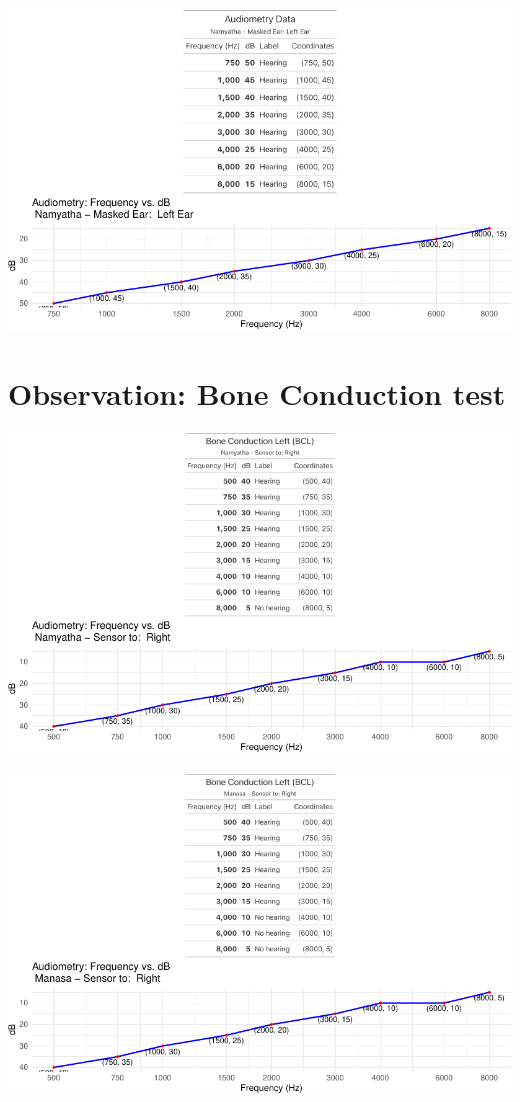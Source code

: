\documentclass[
  11pt,
  letterpaper,
  DIV=11,
  numbers=noendperiod]{scrreprt}
\begin{document}
\includegraphics{audiometry_files/figure-pdf/unnamed-chunk-8-1.pdf}

\section{Observation: Bone Conduction
test}\label{observation-bone-conduction-test}

\includegraphics{audiometry_files/figure-pdf/unnamed-chunk-9-1.pdf}

\includegraphics{audiometry_files/figure-pdf/unnamed-chunk-10-1.pdf}
\end{document}
